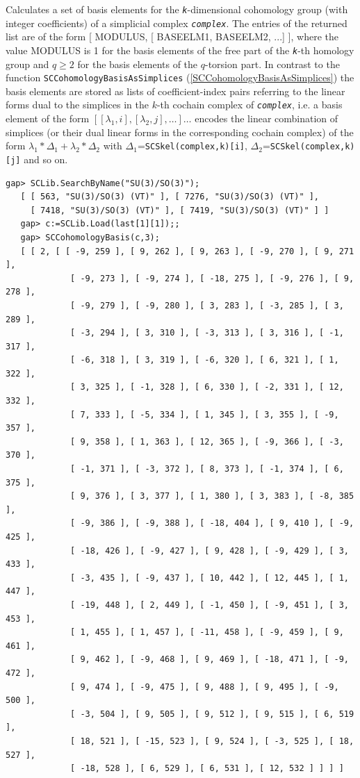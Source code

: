 \documentclass[a4paper,11pt]{report}
\begin{document}
{{{ Calculates a set of basis elements for the \mbox{\texttt{\mdseries\slshape k}}-dimensional cohomology group (with integer coefficients) of a simplicial
complex \mbox{\texttt{\mdseries\slshape complex}}. The entries of the returned list are of the form [ MODULUS, [ BASEELM1,
BASEELM2, ...] ], where the value MODULUS is 1 for the basis elements of the
free part of the \mbox{\texttt{\mdseries\slshape k}}-th homology group and $q\geq 2$ for the basis elements of the $q$-torsion part. In contrast to the function \texttt{SCCohomologyBasisAsSimplices} (\ref{SCCohomologyBasisAsSimplices}) the basis elements are stored as lists of coefficient-index pairs referring to
the linear forms dual to the simplices in the $k$-th cochain complex of \mbox{\texttt{\mdseries\slshape complex}}, i.e. a basis element of the form $[ [ \lambda_1, i], [\lambda_2, j], \dots ] \dots$ encodes the linear combination of simplices (or their dual linear forms in the
corresponding cochain complex) of the form $\lambda_1*\Delta_1+\lambda_2*\Delta_2$ with $\Delta_1$=\texttt{SCSkel(complex,k)[i]}, $\Delta_2$=\texttt{SCSkel(complex,k)[j]} and so on. 
\begin{Verbatim}[commandchars=!@|,fontsize=\small,frame=single,label=Example]
   gap> SCLib.SearchByName("SU(3)/SO(3)");   
   [ [ 563, "SU(3)/SO(3) (VT)" ], [ 7276, "SU(3)/SO(3) (VT)" ], 
     [ 7418, "SU(3)/SO(3) (VT)" ], [ 7419, "SU(3)/SO(3) (VT)" ] ]
   gap> c:=SCLib.Load(last[1][1]);;
   gap> SCCohomologyBasis(c,3); 
   [ [ 2, [ [ -9, 259 ], [ 9, 262 ], [ 9, 263 ], [ -9, 270 ], [ 9, 271 ], 
             [ -9, 273 ], [ -9, 274 ], [ -18, 275 ], [ -9, 276 ], [ 9, 278 ], 
             [ -9, 279 ], [ -9, 280 ], [ 3, 283 ], [ -3, 285 ], [ 3, 289 ], 
             [ -3, 294 ], [ 3, 310 ], [ -3, 313 ], [ 3, 316 ], [ -1, 317 ], 
             [ -6, 318 ], [ 3, 319 ], [ -6, 320 ], [ 6, 321 ], [ 1, 322 ], 
             [ 3, 325 ], [ -1, 328 ], [ 6, 330 ], [ -2, 331 ], [ 12, 332 ], 
             [ 7, 333 ], [ -5, 334 ], [ 1, 345 ], [ 3, 355 ], [ -9, 357 ], 
             [ 9, 358 ], [ 1, 363 ], [ 12, 365 ], [ -9, 366 ], [ -3, 370 ], 
             [ -1, 371 ], [ -3, 372 ], [ 8, 373 ], [ -1, 374 ], [ 6, 375 ], 
             [ 9, 376 ], [ 3, 377 ], [ 1, 380 ], [ 3, 383 ], [ -8, 385 ], 
             [ -9, 386 ], [ -9, 388 ], [ -18, 404 ], [ 9, 410 ], [ -9, 425 ], 
             [ -18, 426 ], [ -9, 427 ], [ 9, 428 ], [ -9, 429 ], [ 3, 433 ], 
             [ -3, 435 ], [ -9, 437 ], [ 10, 442 ], [ 12, 445 ], [ 1, 447 ], 
             [ -19, 448 ], [ 2, 449 ], [ -1, 450 ], [ -9, 451 ], [ 3, 453 ], 
             [ 1, 455 ], [ 1, 457 ], [ -11, 458 ], [ -9, 459 ], [ 9, 461 ], 
             [ 9, 462 ], [ -9, 468 ], [ 9, 469 ], [ -18, 471 ], [ -9, 472 ], 
             [ 9, 474 ], [ -9, 475 ], [ 9, 488 ], [ 9, 495 ], [ -9, 500 ], 
             [ -3, 504 ], [ 9, 505 ], [ 9, 512 ], [ 9, 515 ], [ 6, 519 ], 
             [ 18, 521 ], [ -15, 523 ], [ 9, 524 ], [ -3, 525 ], [ 18, 527 ], 
             [ -18, 528 ], [ 6, 529 ], [ 6, 531 ], [ 12, 532 ] ] ] ]
   

\end{Verbatim}}}}
\end{document}
